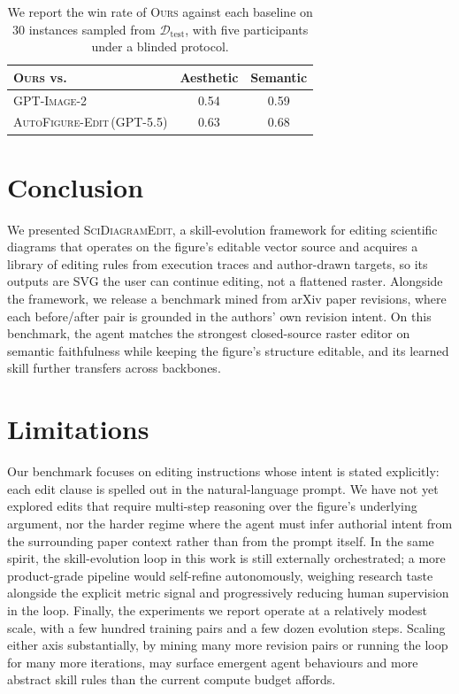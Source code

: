 \documentclass[11pt]{article}
\begin{document}
\begin{table}[t]
\centering\small
\begin{tabular*}{\linewidth}{@{\extracolsep{\fill}}lcc@{}}
\toprule
\textbf{\textsc{Ours} vs.}
  & \textbf{Aesthetic}
  & \textbf{Semantic} \\
\midrule
\textsc{GPT-Image-2}                            & 0.54 & 0.59 \\
\textsc{AutoFigure-Edit}\,(\textsc{GPT-5.5})    & 0.63 & 0.68 \\
\bottomrule
\end{tabular*}
\vspace{-6pt}
\caption{We report the win rate of \textsc{Ours} against each
baseline on 30 instances sampled from
$\mathcal{D}_{\mathrm{test}}$, with five participants under a
blinded protocol.}
\vspace{-10pt}
\label{tab:userstudy}
\end{table}

\section{Conclusion}
\label{sec:conclusion}

We presented \textsc{SciDiagramEdit}, a skill-evolution
framework for editing scientific diagrams that operates on the
figure's editable vector source and acquires a library of
editing rules from execution traces and author-drawn targets,
so its outputs are SVG the user can continue editing, not
a flattened raster.  Alongside the framework, we
release a benchmark mined from arXiv paper revisions, where
each before/after pair is grounded in the authors' own
revision intent.  On this benchmark, the agent matches the strongest
closed-source raster editor on semantic faithfulness while
keeping the figure's structure editable, and its learned
skill further transfers across backbones.

\section*{Limitations}

Our benchmark focuses on editing instructions whose intent is
stated explicitly: each edit clause is spelled out in the
natural-language prompt.  We have not yet explored edits that
require multi-step reasoning over the figure's underlying
argument, nor the harder regime where the agent must infer
authorial intent from the surrounding paper context rather
than from the prompt itself.  In the same spirit, the
skill-evolution loop in this work is still externally
orchestrated; a more product-grade pipeline would self-refine
autonomously, weighing research taste alongside the explicit
metric signal and progressively reducing human supervision in
the loop.  Finally, the experiments we report operate at a
relatively modest scale, with a few hundred training pairs
and a few dozen evolution steps.  Scaling either axis
substantially, by mining many more revision pairs or running
the loop for many more iterations, may surface emergent agent
behaviours and more abstract skill rules than the current
compute budget affords.
\end{document}
